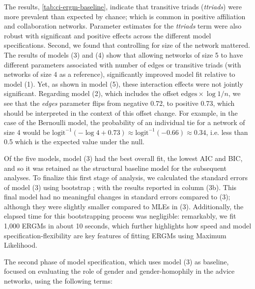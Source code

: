 \documentclass[review, nonatbib,doubleblind]{elsarticle/elsarticle}
\begin{document}


The results, \autoref{tab:ci-ergm-baseline}, indicate that transitive triads (\textit{ttriads}) were more prevalent than expected by chance; which is common in positive affiliation and collaboration networks. Parameter estimates for the \textit{ttriads} term were also robust with significant and positive effects across the different model specifications. Second, we found that controlling for size of the network mattered. The results of models (3) and (4) show that allowing networks of size 5 to have different parameters associated with number of edges or transitive triads (with networks of size 4 as a reference), significantly improved model fit relative to model (1). Yet, as shown in model (5), these interaction effects were not jointly significant. Regarding model (2), which includes the offset $\text{edges} \times \log{1/n}$, we see that the \textit{edges} parameter flips from negative 0.72, to positive 0.73, which should be interpreted in the context of this offset change. For example, in the case of the Bernoulli model, the probability of an individual tie for a network of size 4 would be $\text{logit}^{-1}(-\log{4} + 0.73) \approx \text{logit}^{-1}(-0.66) \approx 0.34$, i.e. less than 0.5 which is the expected value under the null.

Of the five models, model (3) had the best overall fit, the lowest AIC and BIC, and so it was retained as the structural baseline model for the subsequent analyses. To finalize this first stage of analysis, we calculated the standard errors of model (3) using bootstrap \cite[see][]{Wooldridge2010}; with the results reported in column (3b). This final model had no meaningful changes in standard errors compared to (3); although they were slightly smaller compared to MLEs in (3). Additionally, the elapsed time for this bootstrapping process was negligible: remarkably, we fit 1,000 ERGMs in about 10 seconds, which further highlights how speed and model specification-flexibility are key features of fitting ERGMs using Maximum Likelihood.

The second phase of model specification, which uses model (3) as baseline, focused on evaluating the role of gender and gender-homophily in the advice networks, using the following terms: 
\end{document}
